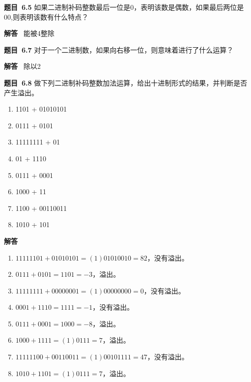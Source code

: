 \documentclass[10pt,a4paper,UTF8]{ctexart}
\newcommand{\problemname}{待定义}
\newenvironment{problem}{\begin{shaded}\par\noindent\textbf{题目\  \problemname}}{\end{shaded}\par}
\newenvironment{solution}{\par\noindent\textbf{解答}\ }{\par}
\begin{document}
\renewcommand{\problemname}{6.5}
\begin{problem}
	如果二进制补码整数最后一位是0，表明该数是偶数，如果最后两位是00,则表明该数有什么特点？
\end{problem}

\begin{solution}
	能被4整除
\end{solution}


\renewcommand{\problemname}{6.7}
\begin{problem}
	对于一个二进制数，如果向右移一位，则意味着进行了什么运算？
\end{problem}

\begin{solution}
	除以2
\end{solution}


\renewcommand{\problemname}{6.8}
\begin{problem}
	做下列二进制补码整数加法运算，给出十进制形式的结果，并判断是否产生溢出。
	\begin{enumerate}[(1)]
		\item 1101 + 01010101
		\item 0111 + 0101
		\item 11111111 + 01
		\item 01 + 1110
		\item 0111 + 0001
		\item 1000 + 11
		\item 1100 + 00110011
		\item 1010 + 101
	\end{enumerate}
\end{problem}

\begin{solution}
	\begin{enumerate}[(1)]
		\item $1111 1101+0101 0101=(1)0101 0010=82$，没有溢出。
		\item $0111+ 0101=1101=-3$，溢出。
		\item $1111 1111+0000 0001=(1)0000 0000=0$，没有溢出。
		\item $0001+ 1110=1111=-1$，没有溢出。
		\item $0111+0001=1000=-8$，溢出。
		\item $1000+1111=(1)0111=7$，溢出。
		\item $1111 1100+0011 0011=(1)0010 1111=47$，没有溢出。
		\item $1010+1101=(1)0111=7$，溢出。
	\end{enumerate}
\end{solution}
\end{document}
